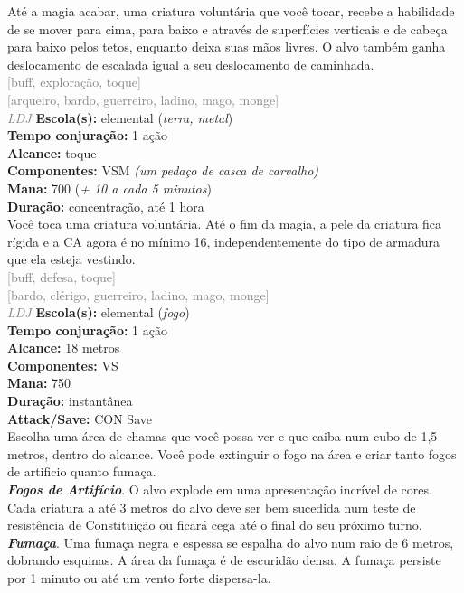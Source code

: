 \documentclass{RPG_Adventure}[2021/10/20]
\begin{document}
{\normalsize Até a magia acabar, uma criatura voluntária que você tocar, recebe a habilidade de se mover para cima, para baixo e através de superfícies verticais e de cabeça para baixo pelos tetos, enquanto deixa suas mãos livres. O alvo também ganha deslocamento de escalada igual a seu deslocamento de caminhada.\\}
{\scriptsize \textcolor{gray}{[buff, exploração, toque]\\}}
{\scriptsize \textcolor{gray}{[arqueiro, bardo, guerreiro, ladino, mago, monge]\\}}
{\tiny \textcolor{gray}{\textit{LDJ}}}
{\small \t \textbf{Escola(s):} elemental (\textit{terra, metal})\\\t \textbf{Tempo conjuração:} 1 ação\\\t \textbf{Alcance:} toque\\\t \textbf{Componentes:} VSM \textit{(um pedaço de casca de carvalho)}\\\t \textbf{Mana:} 700 (\textit{+ 10 a cada 5 minutos})\\\t \textbf{Duração:} concentração, até 1 hora\\}
{\normalsize Você toca uma criatura voluntária. Até o fim da magia, a pele da criatura fica rígida e a CA agora é no mínimo 16, independentemente do tipo de armadura que ela esteja vestindo.\\}
{\scriptsize \textcolor{gray}{[buff, defesa, toque]\\}}
{\scriptsize \textcolor{gray}{[bardo, clérigo, guerreiro, ladino, mago, monge]\\}}
{\tiny \textcolor{gray}{\textit{LDJ}}}
{\small \t \textbf{Escola(s):} elemental (\textit{fogo})\\\t \textbf{Tempo conjuração:} 1 ação\\\t \textbf{Alcance:} 18 metros\\\t \textbf{Componentes:} VS\\\t \textbf{Mana:} 750\\\t \textbf{Duração:} instantânea\\\t \textbf{Attack/Save:} CON Save\\}
{\normalsize Escolha uma área de chamas que você possa ver e que caiba num cubo de 1,5 metros, dentro do alcance. Você pode extinguir o fogo na área e criar tanto fogos de artificio quanto fumaça.\\\t \textbf{\textit{Fogos de Artifício}}. O alvo explode em uma apresentação incrível de cores. Cada criatura a até 3 metros do alvo deve ser bem sucedida num teste de resistência de Constituição ou ficará cega até o final do seu próximo turno.\\\t \textbf{\textit{Fumaça}}. Uma fumaça negra e espessa se espalha do alvo num raio de 6 metros, dobrando esquinas. A área da fumaça é de escuridão densa.  A fumaça persiste por 1 minuto ou até um vento forte dispersa-la.\\}
\end{document}

